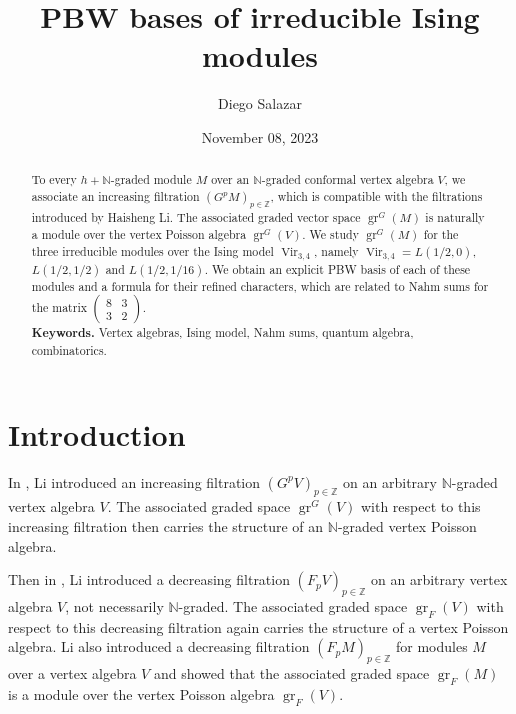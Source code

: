 \documentclass[a4paper, 12pt, reqno]{amsart}
\theoremstyle{remark}
\DeclareMathOperator{\Vir}{Vir}
\DeclareMathOperator{\gr}{gr}
\begin{document}
\setcounter{section}{-1}

\begin{abstract}
  To every $h + \mathbb{N}$-graded module $M$ over an $\mathbb{N}$-graded conformal vertex algebra $V$, we associate an increasing filtration $(G^pM)_{p \in \mathbb{Z}}$, which is compatible with the filtrations introduced by Haisheng Li.
  The associated graded vector space $\gr^G(M)$ is naturally a module over the vertex Poisson algebra $\gr^G(V)$.
  We study $\gr^G(M)$ for the three irreducible modules over the Ising model $\Vir_{3, 4}$, namely $\Vir_{3,4} = L(1/2, 0)$, $L(1/2, 1/2)$ and $L(1/2, 1/16)$.
  We obtain an explicit PBW basis of each of these modules and a formula for their refined characters, which are related to Nahm sums for the matrix $\left(\begin{smallmatrix} 8 & 3 \\ 3 & 2 \end{smallmatrix}\right)$. \\
  \smallskip
  \noindent \textbf{Keywords.} Vertex algebras, Ising model, Nahm sums, quantum algebra, combinatorics.
\end{abstract}

\title{PBW bases of irreducible Ising modules}
\author{Diego Salazar}
\address{Instituto de Matemática Pura e Aplicada, Rio de Janeiro, RJ, Brazil}
\date{November 08, 2023}
\maketitle

\section{Introduction}
\label{sec:introduction}

In \cite{li_vertex_2004}, Li introduced an increasing filtration $(G^pV)_{p \in \mathbb{Z}}$ on an arbitrary $\mathbb{N}$-graded vertex algebra $V$.
The associated graded space $\gr^G(V)$ with respect to this increasing filtration then carries the structure of an $\mathbb{N}$-graded vertex Poisson algebra.

Then in \cite{li_abelianizing_2005}, Li introduced a decreasing filtration $(F_pV)_{p \in \mathbb{Z}}$ on an arbitrary vertex algebra $V$, not necessarily $\mathbb{N}$-graded.
The associated graded space $\gr_F(V)$ with respect to this decreasing filtration again carries the structure of a vertex Poisson algebra.
Li also introduced a decreasing filtration $(F_pM)_{p \in \mathbb{Z}}$ for modules $M$ over a vertex algebra $V$ and showed that the associated graded space $\gr_F(M)$ is a module over the vertex Poisson algebra $\gr_F(V)$.
\end{document}
